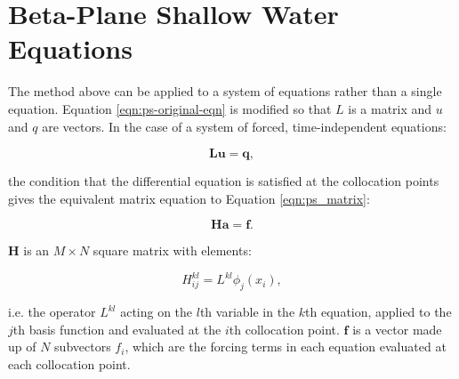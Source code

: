 \section{Beta-Plane Shallow Water Equations}\label{sec:app-systems}



The method above can be applied to a system of equations rather than a single equation. Equation \ref{eqn:ps-original-eqn} is modified so that $L$ is a matrix and $u$ and $q$ are vectors. In the case of a system of forced, time-independent equations:

\begin{equation}\label{eqn:ps-multi-eqns}
  \textbf{L} \textbf{u} = \textbf{q},
\end{equation}

the condition that the differential equation is satisfied at the collocation points gives the equivalent matrix equation to Equation \ref{eqn:ps_matrix}:

\begin{equation}
  \textbf{H} \textbf{a} = \textbf{f}.
\end{equation}

$\textbf{H}$ is an $M \times N$ square matrix with elements:

\begin{equation}
  H^{kl}_{ij} = L^{kl}\phi_{j}(x_{i}),
\end{equation}

i.e. the operator $L^{kl}$ acting on the $l$th variable in the $k$th equation, applied to the $j$th basis function and evaluated at the $i$th collocation point. $\textbf{f}$ is a vector made up of $N$ subvectors $f_{i}$, which are the forcing terms in each equation evaluated at each collocation point.

